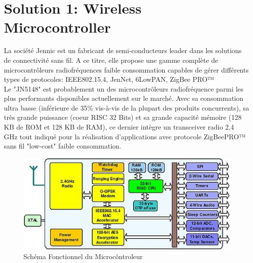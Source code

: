 \documentclass [a4paper] {report}
\begin{document}
\chapter{Solution 1: Wireless Microcontroller}

La société Jennic est un fabricant  de semi-conducteurs leader dans les solutions de connectivit\'e sans fil. A ce titre, elle propose une gamme compl\`ete de microcontrôleurs radiofr\'equences faible consommation capables de g\'erer diff\'erents types de protocoles: IEEE802.15.4, JenNet, 6LowPAN, ZigBee PRO™\\

Le "JN5148" est probablement un des microcontr\^oleurs radiofr\'equence parmi les plus performants disponibles actuellement sur le march\'e. Avec sa consommation ultra basse (inf\'erieure de 35\% vis-\`a-vis de la plupart des produits concurrents), sa tr\`es grande puissance (coeur RISC 32 Bits) et sa grande capacit\'e m\'emoire (128 KB de ROM et 128 KB de RAM), ce dernier int\`egre un transceiver radio 2,4 GHz tout indiqu\'e pour la r\'ealisation d'applications avec protocole ZigBeePRO™ sans fil "low-cost" faible consommation.   \\

\begin{figure}[h]
\centering
\includegraphics[width=1\textwidth]{Solution Wireless Microcontroller.jpg}
\caption{\label{Solution Wireless Microcontroller}Sch\'ema Fonctionnel du Microc\^ontroleur}
\end{figure}
\end{document}
